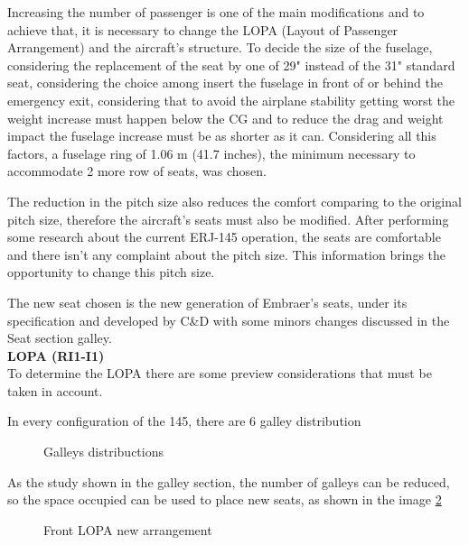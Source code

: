 ﻿%
Increasing the number of passenger is one of the main modifications and to achieve that, it is necessary to change the LOPA (Layout of Passenger Arrangement) and the aircraft's structure. To decide the size of the fuselage, considering the replacement of the seat by one of 29" instead of the 31" standard seat, considering the choice among insert the fuselage in front of or behind the emergency exit, considering that to avoid the airplane stability getting worst the weight increase must happen below the CG and to reduce the drag and weight impact the fuselage increase must be as shorter as it can. Considering all this factors, a fuselage ring of 1.06 m (41.7 inches), the minimum necessary to accommodate 2 more row of seats, was chosen.


The reduction in the pitch size also reduces the comfort comparing to the original pitch size, therefore the aircraft's seats must also be modified. After performing some research about the current ERJ-145 operation, the seats are comfortable and there isn't any complaint about the pitch size. This information brings the opportunity to change this pitch size.

The new seat chosen is the new generation of Embraer's seats, under its specification and developed by C\&D with some minors changes discussed in the Seat section galley.\\

\textbf{LOPA (RI1-I1)}
\\

To determine the LOPA there are some preview considerations that must be taken in account.

In every configuration of the 145, there are 6 galley distribution
\begin{figure}[H] %
\caption{Galleys distribuctions}
\label{fig:galleysdistribuction}
\end{figure}

As the study shown in the galley section, the number of galleys can be reduced, so the space occupied can be used to place new seats, as shown in the image \ref{fig:frontlopa}


\begin{figure}[H] %
\caption{Front LOPA new arrangement}
\label{fig:frontlopa}
\end{figure}

